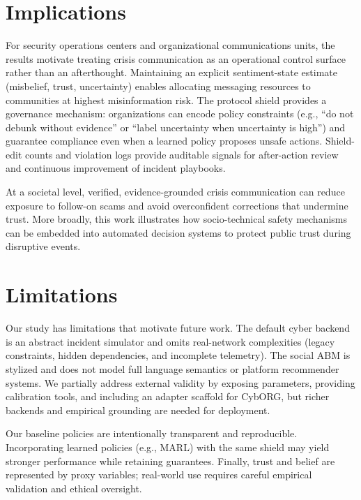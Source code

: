 \documentclass[biomimetics,article,submit,pdftex,moreauthors]{Definitions/mdpi}
\begin{document}
\section{Implications}
For security operations centers and organizational communications units, the results motivate treating crisis communication as an operational control surface rather than an afterthought. Maintaining an explicit sentiment-state estimate (misbelief, trust, uncertainty) enables allocating messaging resources to communities at highest misinformation risk. The protocol shield provides a governance mechanism: organizations can encode policy constraints (e.g., ``do not debunk without evidence'' or ``label uncertainty when uncertainty is high'') and guarantee compliance even when a learned policy proposes unsafe actions. Shield-edit counts and violation logs provide auditable signals for after-action review and continuous improvement of incident playbooks.

At a societal level, verified, evidence-grounded crisis communication can reduce exposure to follow-on scams and avoid overconfident corrections that undermine trust. More broadly, this work illustrates how socio-technical safety mechanisms can be embedded into automated decision systems to protect public trust during disruptive events.

\section{Limitations}
Our study has limitations that motivate future work. The default cyber backend is an abstract incident simulator and omits real-network complexities (legacy constraints, hidden dependencies, and incomplete telemetry). The social ABM is stylized and does not model full language semantics or platform recommender systems. We partially address external validity by exposing parameters, providing calibration tools, and including an adapter scaffold for CybORG, but richer backends and empirical grounding are needed for deployment.

Our baseline policies are intentionally transparent and reproducible. Incorporating learned policies (e.g., MARL) with the same shield may yield stronger performance while retaining guarantees. Finally, trust and belief are represented by proxy variables; real-world use requires careful empirical validation and ethical oversight.
\end{document}
